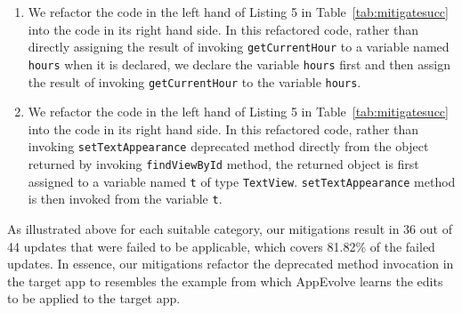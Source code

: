 \begin{enumerate}
\item We refactor the code in the left hand of Listing 5 in  Table~\ref{tab:mitigatesucc} into the code in its right hand side. In this refactored code, rather than directly assigning the result of invoking {\tt getCurrentHour} to a variable named {\tt hours} when it is declared, we declare the variable {\tt hours} first and then assign the result of invoking {\tt getCurrentHour} to the variable {\tt hours}.

\item We refactor the code in the left hand of Listing 5 in  Table~\ref{tab:mitigatesucc} into the code in its right hand side. In this refactored code, rather than invoking {\tt setTextAppearance} deprecated method directly from the object returned by invoking {\tt findViewById} method, the returned object is first assigned to a variable named {\tt t} of type {\tt TextView}. {\tt setTextAppearance} method is then invoked from the variable {\tt t}.

\end{enumerate}

As illustrated above for each suitable category, our mitigations result in 36 out of 44 updates that were failed to be applicable, which covers 81.82\% of the failed updates. In essence, our mitigations refactor the deprecated method invocation in the target app to resembles the example from which AppEvolve learns the edits to be applied to the target app. 
